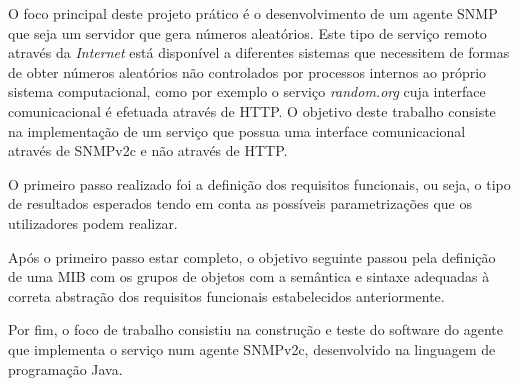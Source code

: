 \documentclass[../momento_1.tex]{subfiles}
\begin{document}
O foco principal deste projeto prático é o desenvolvimento de um agente SNMP que seja um servidor que gera números aleatórios. Este tipo de serviço remoto através da \textit{Internet} está disponível a diferentes sistemas que necessitem de formas de obter números aleatórios não controlados por processos internos ao próprio sistema computacional, como por exemplo o serviço \textit{random.org} cuja interface comunicacional é efetuada através de HTTP. O objetivo deste trabalho consiste na implementação de um serviço que possua uma interface comunicacional através de SNMPv2c e não através de HTTP.\par
O primeiro passo realizado foi a definição dos requisitos funcionais, ou seja, o tipo de
resultados esperados tendo em conta as possíveis parametrizações que os utilizadores podem realizar.\par 
Após o primeiro passo estar completo, o objetivo seguinte passou pela definição de uma MIB com os grupos de objetos com a semântica e sintaxe adequadas à correta abstração dos requisitos funcionais estabelecidos anteriormente. \par
Por fim, o foco de trabalho consistiu na construção e teste do software do agente que implementa o serviço num agente SNMPv2c, desenvolvido na linguagem de programação Java.\\[5cm]
\end{document}

